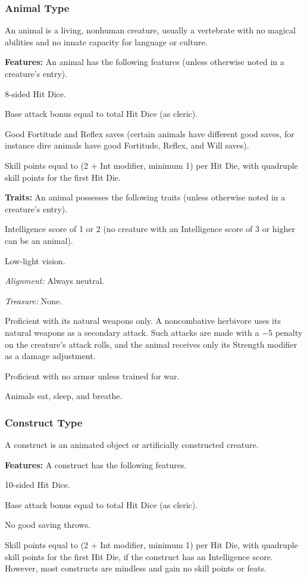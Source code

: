 \subsubsection{Animal Type}
An animal is a living, nonhuman creature, usually a vertebrate with no magical abilities and no innate capacity for language or culture.

\textbf{Features:} An animal has the following features (unless otherwise noted in a creature's entry).
\begin{itemize*}
\item 8-sided Hit Dice.
\item Base attack bonus equal to \threequarters total Hit Dice (as cleric).
\item Good Fortitude and Reflex saves (certain animals have different good saves, for instance dire animals have good Fortitude, Reflex, and Will saves).
\item Skill points equal to (2 + Int modifier, minimum 1) per Hit Die, with quadruple skill points for the first Hit Die.
\end{itemize*}

\textbf{Traits:} An animal possesses the following traits (unless otherwise noted in a creature's entry).
\begin{itemize*}
\item Intelligence score of 1 or 2 (no creature with an Intelligence score of 3 or higher can be an animal).
\item Low-light vision.
\item \emph{Alignment:} Always neutral.
\item \emph{Treasure:} None.
\item Proficient with its natural weapons only. A noncombative herbivore uses its natural weapons as a secondary attack. Such attacks are made with a $-5$ penalty on the creature's attack rolls, and the animal receives only \onehalf its Strength modifier as a damage adjustment.
\item Proficient with no armor unless trained for war.
\item Animals eat, sleep, and breathe.
\end{itemize*}

\subsubsection{Construct Type}
A construct is an animated object or artificially constructed creature.

\textbf{Features:} A construct has the following features.
\begin{itemize*}
\item 10-sided Hit Dice.
\item Base attack bonus equal to \threequarters total Hit Dice (as cleric).
\item No good saving throws.
\item Skill points equal to (2 + Int modifier, minimum 1) per Hit Die, with quadruple skill points for the first Hit Die, if the construct has an Intelligence score. However, most constructs are mindless and gain no skill points or feats.
\end{itemize*}

